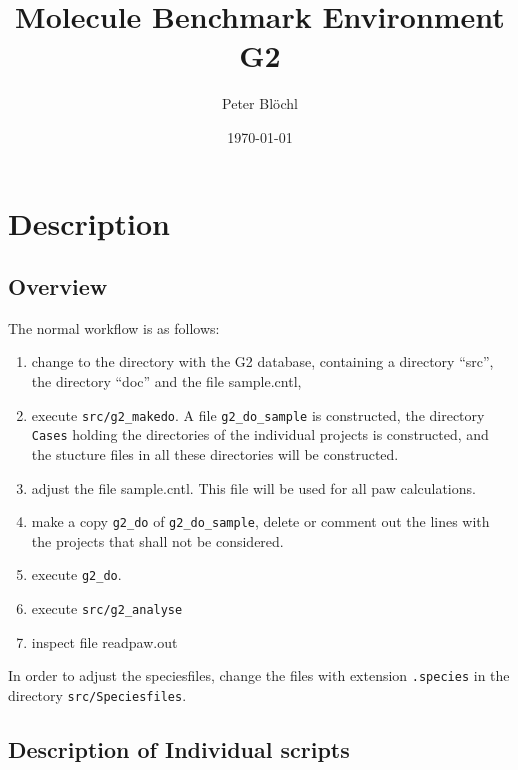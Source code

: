 \documentclass[a4paper,10pt]{report}
\begin{document}
\title{{\Huge Molecule Benchmark Environment G2}}
\author{Peter Bl\"ochl}
\date{\today}
\maketitle
\tableofcontents
\chapter{Description}
\section{Overview}
The normal workflow is as follows:
\begin{enumerate}
\item change to the directory with the G2 database, containing a
  directory ``src'', the directory ``doc'' and the file sample.cntl,
\item execute \verb|src/g2_makedo|. A file \verb|g2_do_sample| is
  constructed, the directory \verb|Cases| holding the directories of
  the individual projects is constructed, and the stucture files in
  all these directories will be constructed.
\item adjust the file sample.cntl. This file will be used for all paw
  calculations.
\item make a copy \verb|g2_do| of \verb|g2_do_sample|, delete or
  comment out the lines with the projects that shall not be
  considered.
\item execute \verb|g2_do|. 
\item execute \verb|src/g2_analyse|
\item inspect file readpaw.out
\end{enumerate}


In order to adjust the speciesfiles, change the files with extension
\verb|.species| in the directory \verb|src/Speciesfiles|.
 

\section{Description of Individual scripts}


\end{document}
